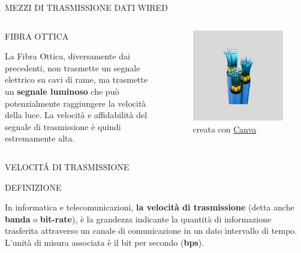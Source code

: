 \documentclass[aspectratio=1610]{beamer}
\begin{document}
\begin{frame}{MEZZI DI TRASMISSIONE DATI WIRED}
    \begin{columns}
        \begin{alertblock}{FIBRA OTTICA}
            \begin{minipage}{0.97\linewidth}
                \justifying
                La Fibra Ottica, diversamente dai precedenti, non trasmette un segnale elettrico 
                su cavi di rame, ma trasmette un \textbf{segnale luminoso} che può potenzialmente raggiungere 
                la velocità della luce. La velocità e affidabilità del segnale di trasmissione è quindi 
                estremamente alta.
            \end{minipage}
        \end{alertblock}
           \begin{figure}
               \includegraphics[width=\linewidth]{img/fibra_ottica.png}
               \caption{{creata con \href{https://www.canva.com/}{Canva}}}
           \end{figure}
    \end{columns}
\end{frame}

\begin{frame}{VELOCIT\'A DI TRASMISSIONE}
    \begin{alertblock}{DEFINIZIONE}
        \begin{minipage}{0.98\linewidth}
            \justifying
            In informatica e telecomunicazioni, \textbf{la velocità di trasmissione} 
            (detta anche \textbf{banda} o \textbf{bit-rate}), 
            è la grandezza indicante la quantità di informazione trasferita 
            attraverso un canale di comunicazione in un dato intervallo di tempo. 
            L'unità di misura associata è il bit per secondo (\textbf{bps}).
        \end{minipage}
    \end{alertblock}
\end{frame}
\end{document}

